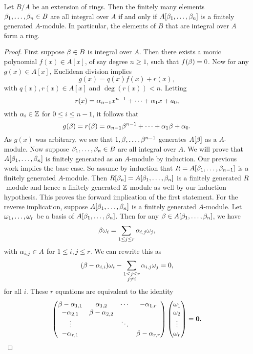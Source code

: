    \begin{proposition}\label{prop:integral_if_finitely_generated}
      Let $B/A$ be an extension of rings. Then the finitely many elements $\beta_{1},\ldots,\beta_{n} \in B$ are all integral over $A$ if and only if $A[\beta_{1},\ldots,\beta_{n}]$ is a finitely generated $A$-module. In particular, the elements of $B$ that are integral over $A$ form a ring.
    \end{proposition}
    \begin{proof}
      First suppose $\beta \in B$ is integral over $A$. Then there exists a monic polynomial $f(x) \in A[x]$, of say degree $n \ge 1$, such that $f(\beta) = 0$. Now for any $g(x) \in A[x]$, Euclidean division implies
      \[
        g(x) = q(x)f(x)+r(x),
      \]
      with $q(x),r(x) \in A[x]$ and $\deg(r(x)) < n$. Letting
      \[
        r(x) = \alpha_{n-1}x^{n-1}+\cdots+\alpha_{1}x+a_{0},
      \]
      with $\alpha_{i} \in \mathbb{Z}$ for $0 \le i \le n-1$, it follows that
      \[
        g(\beta) = r(\beta) = \alpha_{n-1}\beta^{n-1}+\cdots+\alpha_{1}\beta+\alpha_{0}.
      \]
      As $g(x)$ was arbitrary, we see that $1,\beta,\ldots,\beta^{n-1}$ generates $A[\beta]$ as a $A$-module. Now suppose $\beta_{1},\ldots,\beta_{n} \in B$ are all integral over $A$. We will prove that $A[\beta_{1},\ldots,\beta_{n}]$ is finitely generated as an $A$-module by induction. Our previous work implies the base case. So assume by induction that $R = A[\beta_{1},\ldots,\beta_{n-1}]$ is a finitely generated $A$-module. Then $R[\beta_{n}] = A[\beta_{1},\ldots,\beta_{n}]$ is a finitely generated $R$-module and hence a finitely generated $\mathbb{Z}$-module as well by our induction hypothesis. This proves the forward implication of the first statement. For the reverse implication, suppose $A[\beta_{1},\ldots,\beta_{n}]$ is a finitely generated $A$-module. Let $\omega_{1},\ldots,\omega_{r}$ be a basis of $A[\beta_{1},\ldots,\beta_{n}]$. Then for any $\beta \in A[\beta_{1},\ldots,\beta_{n}]$, we have
      \[
        \beta\omega_{i} = \sum_{1 \le j \le r}\alpha_{i,j}\omega_{j},
      \]
      with $\alpha_{i,j} \in A$ for $1 \le i,j \le r$. We can rewrite this as
      \[
        (\beta-\alpha_{i,i})\omega_{i}-\sum_{\substack{1 \le j \le r \\ j \neq i}}\alpha_{i,j}\omega_{j} = 0,
      \]
      for all $i$. These $r$ equations are equivalent to the identity
      \[
        \begin{pmatrix} \beta-\alpha_{1,1} & \alpha_{1,2} & \cdots & -\alpha_{1,r} \\ -\alpha_{2,1} & \beta-\alpha_{2,2} & & \\ \vdots & & \ddots & \\ -\alpha_{r,1} & & & \beta-\alpha_{r,r} \end{pmatrix}\begin{pmatrix} \omega_{1} \\ \omega_{2} \\ \vdots \\ \omega_{r} \end{pmatrix} = \mathbf{0}.
\]
\end{proof}
